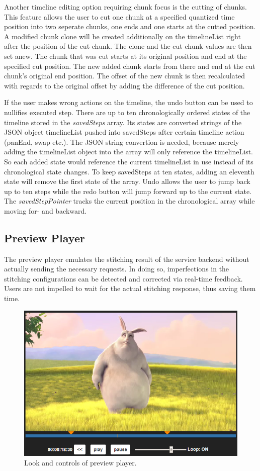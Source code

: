 \documentclass[conference]{IEEEtran}
\begin{document}
Another timeline editing option requiring chunk focus is the cutting of chunks.
This feature allows the user to cut one chunk at a specified quantized time position into two seperate chunks, one ends and one starts at the cutted position.
A modified chunk clone will be created additionally on the timelineList right after the position of the cut chunk.
The clone and the cut chunk values are then set anew.
The chunk that was cut starts at its original position and end at the specified cut position.
The new added chunk starts from there and end at the cut chunk's original end position.
The offset of the new chunk is then recalculated with regards to the original offset by adding the difference of the cut position. 

If the user makes wrong actions on the timeline, the undo button can be used to nullifies executed step.
There are up to ten chronologically ordered states of the timeline stored in the \textit{savedSteps} array.
Its states are converted strings of the JSON object timelineList pushed into savedSteps after certain timeline action (panEnd, swap etc.).
The JSON string convertion is needed, because merely adding the timelineList object into the array will only reference the timelineList.
So each added state would reference the current timelineList in use instead of its chronological state changes.
To keep savedSteps at ten states, adding an eleventh state will remove the first state of the array.
Undo allows the user to jump back up to ten steps while the redo button will jump forward up to the current state.
The \textit{savedStepPointer} tracks the current position in the chronological array while moving for- and backward.

\subsection{Preview Player}
The preview player emulates the stitching result of the service backend without actually sending the necessary requests.
In doing so, imperfections in the stitching configurations can be detected and corrected via real-time feedback.
Users are not impelled to wait for the actual stitching response, thus saving them time.
\begin{figure}[H]
\centering
\includegraphics[scale=0.5]{preview_player.png}
\caption{Look and controls of preview player.}
\end{figure}
\end{document}
